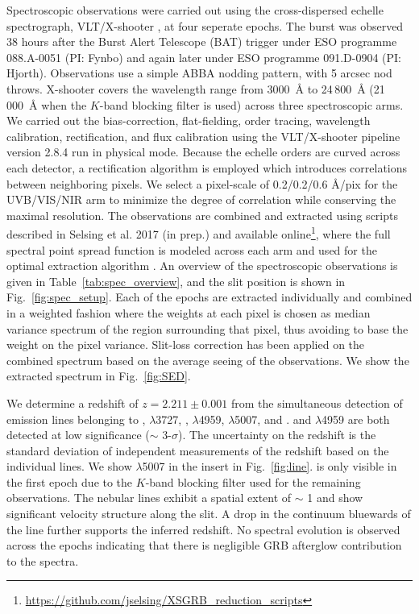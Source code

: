 \documentclass{aa}    %
\begin{document}
Spectroscopic observations were carried out using the cross-dispersed echelle
spectrograph, VLT/X-shooter \citep{Vernet2011}, at four seperate epochs. The
burst was observed 38 hours after the Burst Alert Telescope (BAT) trigger under
ESO programme 088.A-0051 (PI: Fynbo) and again later under ESO programme
091.D-0904 (PI: Hjorth). Observations use a simple ABBA nodding pattern, with 5
arcsec nod throws. X-shooter covers the wavelength range from 3000~\AA{} to
24\,800~\AA{} (21\,000~\AA{} when the $K$-band blocking filter is used) across
three spectroscopic arms. We carried out the bias-correction, flat-fielding,
order tracing, wavelength calibration, rectification, and flux calibration using
the VLT/X-shooter pipeline version 2.8.4 \citep{Goldoni2006, Modigliani2010} run
in physical mode. Because the echelle orders are curved across each detector, a
rectification algorithm is employed which introduces correlations between
neighboring pixels. We select a pixel-scale of 0.2/0.2/0.6 \AA/pix for the
UVB/VIS/NIR arm to minimize the degree of correlation while conserving the
maximal resolution. The observations are combined and extracted using scripts
described in Selsing et al. 2017 (in prep.) and available
online\footnote{\url{https://github.com/jselsing/XSGRB_reduction_scripts}},
where the full spectral point spread function is modeled across each arm and
used for the optimal extraction algorithm \citep{Horne1986}. An overview of the
spectroscopic observations is given in Table~\ref{tab:spec_overview}, and the
slit position is shown in Fig.~\ref{fig:spec_setup}. Each of the epochs are
extracted individually and combined in a weighted fashion where the weights at
each pixel is chosen as median variance spectrum of the region surrounding that
pixel, thus avoiding to base the weight on the pixel variance. Slit-loss
correction has been applied on the combined spectrum based on the average seeing
of the observations. We show the extracted spectrum in Fig.~\ref{fig:SED}.



We determine a redshift of $z = 2.211 \pm 0.001$ from the simultaneous detection
of emission lines belonging to \lya, \oii$\lambda$3727, \hb, \oiii$\lambda$4959,
\oiii$\lambda$5007, and \ha. \hb{} and \oiii$\lambda$4959 are both detected at
low significance ($\sim$ 3-$\sigma$). The uncertainty on the redshift is the
standard deviation of independent measurements of the redshift based on the
individual lines. We show \oiii$\lambda$5007 in the insert in
Fig.~\ref{fig:line}.  \ha{} is only visible in the first epoch due to the
$K$-band blocking filter used for the remaining observations. The nebular lines
exhibit a spatial extent of $\sim$ 1 and show significant velocity
structure along the slit. A drop in the continuum bluewards of the \lya{} line
further supports the inferred redshift. No spectral evolution is observed across
the epochs indicating that there is negligible GRB afterglow contribution to the
spectra.
\end{document}

